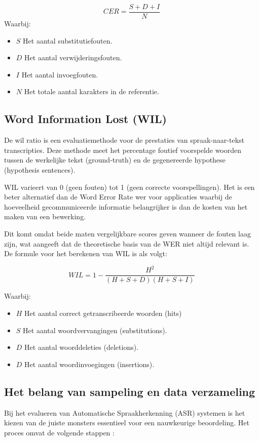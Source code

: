 \begin{equation}
    CER = \frac{S + D + I}{N}
\end{equation}
Waarbij:
\begin{itemize}
    \item $S$ Het aantal substitutiefouten.
    \item $D$ Het aantal verwijderingsfouten.
    \item $I$ Het aantal invoegfouten.
    \item $N$ Het totale aantal karakters in de referentie.
\end{itemize}

\subsection{Word Information Lost (WIL)}

De \gls{wil} ratio is een evaluatiemethode voor de prestaties van spraak-naar-tekst transcripties. Deze methode meet het percentage foutief voorspelde woorden tussen de werkelijke tekst (ground-truth) en de gegenereerde hypothese (hypothesis sentences). 

WIL varieert van 0 (geen fouten) tot 1 (geen correcte voorspellingen). Het is een beter alternatief dan de Word Error Rate \gls{wer} voor applicaties waarbij de hoeveelheid gecommuniceerde informatie belangrijker is dan de kosten van het maken van een bewerking.

Dit komt omdat beide maten vergelijkbare scores geven wanneer de fouten laag zijn, wat aangeeft dat de theoretische basis van de WER niet altijd relevant is. De formule voor het berekenen van WIL is als volgt:


\begin{equation}
    WIL = 1 - \frac{H^2}{(H + S + D)(H + S + I)}
\end{equation}


Waarbij:

\begin{itemize}
    \item $H$ Het aantal correct getranscribeerde woorden (hits)
    \item $S$ Het aantal woordvervangingen (substitutions).
    \item $D$ Het aantal woorddeleties (deletions).
    \item $D$ Het aantal woordinvoegingen (insertions).
\end{itemize}
\subsection{Het belang van sampeling en data verzameling}
Bij het evalueren van Automatische Spraakherkenning (ASR) systemen is het kiezen van de juiste monsters essentieel voor een nauwkeurige beoordeling. Het proces omvat de volgende stappen \autocite{awsmlblog2023}:

